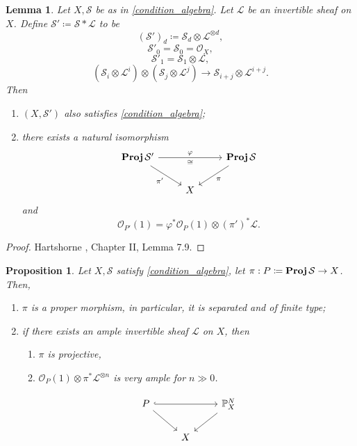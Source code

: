 \documentclass[12pt]{article}
\DeclareMathOperator{\relProj}{\textnormal{\textbf{Proj}}}
\newtheorem*{proposition}{Proposition}
\newtheorem*{lemma}{Lemma}
\theoremstyle{definition}
\begin{document}
\begin{lemma}
Let $X,\mathcal S$ be as in \eqref{condition_algebra}. Let $\mathcal L$ be an invertible sheaf on $X$. Define $\mathcal S'\coloneqq\mathcal S*\mathcal L$ to be
\[(\mathcal S')_d\coloneqq\mathcal S_d\otimes\mathcal L^{\otimes d},\]
\[\mathcal S'_0=\mathcal S_0=\mathcal O_X,\]
\[\mathcal S'_1=\mathcal S_1\otimes\mathcal L,\]
\[(\mathcal S_i\otimes\mathcal L^i)\otimes(\mathcal S_j\otimes\mathcal L^j)\longrightarrow\mathcal S_{i+j}\otimes\mathcal L^{i+j}.\]
Then
\begin{enumerate}[label=\arabic*)]
\item $(X,\mathcal S')$ also satisfies \eqref{condition_algebra};

\item there exists a natural isomorphism
\[\begin{tikzcd}\relProj\mathcal S'\arrow[rr,"\varphi","\cong"']\arrow[rd,"\pi'",swap]&&\relProj\mathcal S\arrow[ld,"\pi"]\\&X\end{tikzcd}\]
and
\[\mathcal O_{P'}(1)=\varphi^*\mathcal O_P(1)\otimes(\pi')^*\mathcal L.\]
\end{enumerate}
\end{lemma}

\begin{proof}
Hartshorne \cite{hartshorne2013algebraic}, Chapter II, Lemma 7.9.
\end{proof}

\begin{proposition}
Let $X,\mathcal S$ satisfy \eqref{condition_algebra}, let $\pi:P\coloneqq\relProj\mathcal S\rightarrow X$. Then,
\begin{enumerate}[label=\arabic*)]
\item $\pi$ is a proper morphism, in particular, it is separated and of finite type;
\item if there exists an ample invertible sheaf $\mathcal L$ on $X$, then
\begin{enumerate}[label=\roman*)]
\item $\pi$ is projective,
\item $\mathcal O_P(1)\otimes\pi^*\mathcal L^{\otimes n}$ is very ample for $n\gg0$.
\end{enumerate}
\[\begin{tikzcd}P\arrow[rr,hook]\arrow[rd]&&\mathbb P_X^N\arrow[ld]\\&X\end{tikzcd}\]
\end{enumerate}
\end{proposition}
\end{document}
